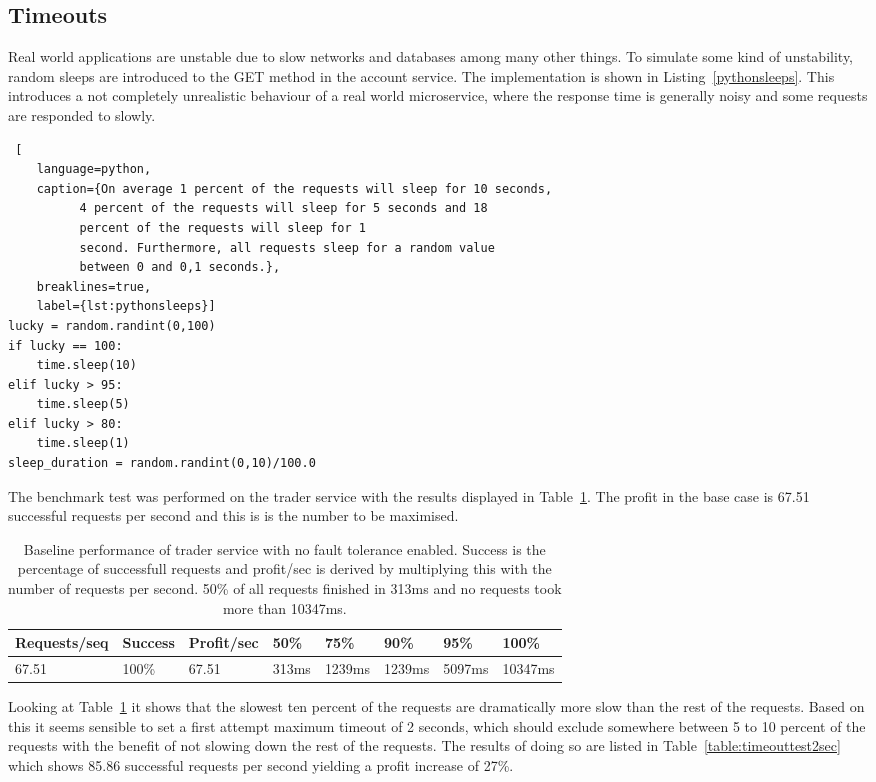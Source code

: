 \subsection{Timeouts}
Real world applications are unstable due to slow networks and
databases among many other things. To simulate some kind of
unstability, random sleeps are introduced to the GET method in the
account service. The implementation is shown in
Listing~\ref{pythonsleeps}. This introduces a not completely
unrealistic behaviour of a real world microservice, where the response
time is generally noisy and some requests are responded to slowly.
\begin{lstlisting} [
	language=python,
	caption={On average 1 percent of the requests will sleep for 10 seconds,
          4 percent of the requests will sleep for 5 seconds and 18
          percent of the requests will sleep for 1
          second. Furthermore, all requests sleep for a random value
          between 0 and 0,1 seconds.},
	breaklines=true,
	label={lst:pythonsleeps}]
lucky = random.randint(0,100) 
if lucky == 100:
    time.sleep(10)
elif lucky > 95:
    time.sleep(5)
elif lucky > 80:
    time.sleep(1)
sleep_duration = random.randint(0,10)/100.0
\end{lstlisting}
The benchmark test was performed on the trader service with the
results displayed in Table~\ref{table:baselinetest}. The profit in the
base case is 67.51 successful requests per second and this is is the
number to be maximised.

\begin{table}[]
\centering
\caption{Baseline performance of trader service with no fault
  tolerance enabled. Success is the percentage of successfull requests
and profit/sec is derived by multiplying this with the number of
requests per second. 50\% of all requests finished in 313ms and no
requests took more than 10347ms.}
\label{table:baselinetest}
\begin{tabular}{|l|l|l|l|l|l|l|l|}
\hline
Requests/seq & Success & Profit/sec & 50\% & 75\% & 90\% & 95\% & 100\% \\ \hline
67.51 & 100\% & 67.51 & 313ms & 1239ms & 1239ms & 5097ms & 10347ms\\ \hline
\end{tabular}
\end{table}
Looking at Table~\ref{table:baselinetest} it shows that the slowest
ten percent of the requests are dramatically more slow than the rest
of the requests. Based on this it seems sensible to set a first
attempt maximum timeout of 2 seconds, which should exclude somewhere
between 5 to 10 percent of the requests with the benefit of not
slowing down the rest of the requests. The results of doing so are
listed in Table~\ref{table:timeouttest2sec} which shows 85.86
successful requests per second yielding a profit increase of 27\%.

